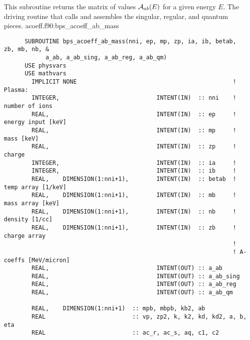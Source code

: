 \documentclass[preprint,12pt,eqsecnum,nofootinbib,amsmath,amssymb]{revtex4}
\begin{document}
This subroutine returns the matrix of values ${\cal A}_{ab}(E)$ for a
given energy $E$. The driving routine that calls and assembles the
singular, regular, and quantum pieces.  
\vskip0.4cm
\noindent
acoeff.f90:bps\_acoeff\_ab\_mass
{
\baselineskip 10pt
\begin{verbatim}
      SUBROUTINE bps_acoeff_ab_mass(nni, ep, mp, zp, ia, ib, betab, zb, mb, nb, &
            a_ab, a_ab_sing, a_ab_reg, a_ab_qm)
      USE physvars
      USE mathvars    
        IMPLICIT NONE                                             ! Plasma:
        INTEGER,                            INTENT(IN)  :: nni    !  number of ions
        REAL,                               INTENT(IN)  :: ep     !  energy input [keV]
        REAL,                               INTENT(IN)  :: mp     !  mass [keV]
        REAL,                               INTENT(IN)  :: zp     !  charge
        INTEGER,                            INTENT(IN)  :: ia     !  
        INTEGER,                            INTENT(IN)  :: ib     !  
        REAL,    DIMENSION(1:nni+1),        INTENT(IN)  :: betab  !  temp array [1/keV]
        REAL,    DIMENSION(1:nni+1),        INTENT(IN)  :: mb     !  mass array [keV]
        REAL,    DIMENSION(1:nni+1),        INTENT(IN)  :: nb     !  density [1/cc]
        REAL,    DIMENSION(1:nni+1),        INTENT(IN)  :: zb     !  charge array
                                                                  !
                                                                  ! A-coeffs [MeV/micron]
        REAL,                               INTENT(OUT) :: a_ab
        REAL,                               INTENT(OUT) :: a_ab_sing
        REAL,                               INTENT(OUT) :: a_ab_reg
        REAL,                               INTENT(OUT) :: a_ab_qm

        REAL,    DIMENSION(1:nni+1)  :: mpb, mbpb, kb2, ab
        REAL                         :: vp, zp2, k, k2, kd, kd2, a, b, eta
        REAL                         :: ac_r, ac_s, aq, c1, c2


\end{verbatim}}
\end{document}
